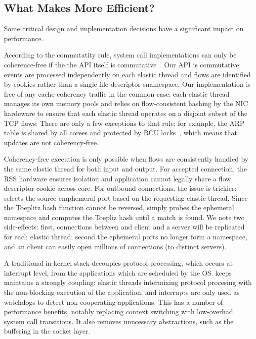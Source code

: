 \subsection{What Makes \ix More Efficient?}
\label{sec:impl:better}

Some critical design and implementation decisions have a significant
impact on performance.

According to the commutatity rule, system call implementations can
only be coherence-free if the the API itself is
commutative~\cite{DBLP:conf/sosp/ClementsKZMK13}.  Our API is
commutative: events are processed independently on each elastic thread
and flows are identified by cookies rather than a single file
descriptor snamespace.  Our implementation is free of any
cache-coherency traffic in the common case: each elastic thread
manages its own memory pools and \ix relies on flow-consistent hashing
by the NIC hardeware to ensure that each elastic thread operates on a
disjoint subset of the TCP flows.  There are only a few exceptions to
that rule: for example, the ARP table is shared by all corees and
protected by RCU locks~\cite{mckenney1998read}, which means that
updates are not coherency-free.

 Coherency-free execution is only possible when flows are consistently
handled by the same elastic thread for both input and output.  For
accepted connection, the RSS hardware ensures isolation and
application cannot legally share a flow descriptor cookie across core.
For outbound connections, the issue is trickier: \ix selects the
source emphemeral port based on the requesting elastic thread. Since
the Toeplitz hash function cannot be reversed, \ix simply probes the
ephemeral namespace and computes the Toepliz hash until a match is
found.  We note two side-effects: first, connections between and \ix
client and a server will be replicated for each elastic thread; second
the ephemeral ports no longer form a namespace, and an \ix client can
easily open millions of connections (to distinct servers).

A traditional in-kernel stack decouples protocol processing, which
occurs at interrupt level, from the applications which are scheduled
by the OS.  \ix keeps maintains a strongly coupling: elastic threads
intermixing protocol procesing with the non-blocking execution of the
application, and interrupts are only used as watchdogs to detect
non-cooperating applications.  This has a number of performance
benefits, notably replacing context switching with low-overhad system
call transitions.  It also removes unncessary abstractions, such as
the buffering in the socket layer.

